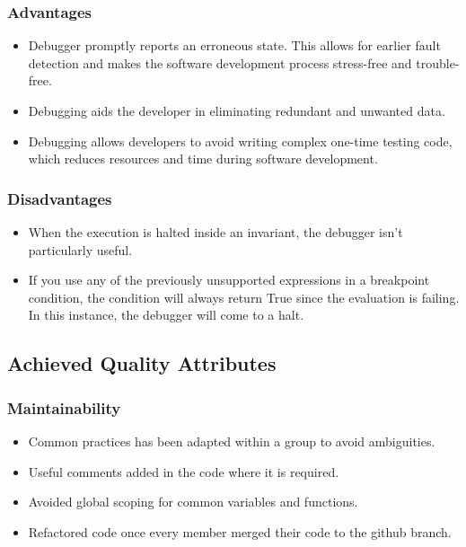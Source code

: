 \documentclass[a4paper,12pt]{article}
\begin{document}
    \subsubsection*{Advantages}
    \begin{itemize}
        \item Debugger promptly reports an erroneous state. This allows for earlier fault detection and makes the software development process stress-free and trouble-free.
        \item Debugging aids the developer in eliminating redundant and unwanted data.
        \item Debugging allows developers to avoid writing complex one-time testing code, which reduces resources and time during software development.
    \end{itemize}
    
    \subsubsection*{Disadvantages}
    \begin{itemize}
        \item When the execution is halted inside an invariant, the debugger isn't particularly useful.
        \item If you use any of the previously unsupported expressions in a breakpoint condition, the condition will always return True since the evaluation is failing. In this instance, the debugger will come to a halt.
    \end{itemize}

\subsection{Achieved Quality Attributes}

    \subsubsection{Maintainability}
        \begin{itemize}
            \item Common practices has been adapted within a group to avoid ambiguities.
            \item Useful comments added in the code where it is required.
            \item Avoided global scoping for common variables and functions.
            \item Refactored code once every member merged their code to the github branch.
        \end{itemize}
    
\end{document}
